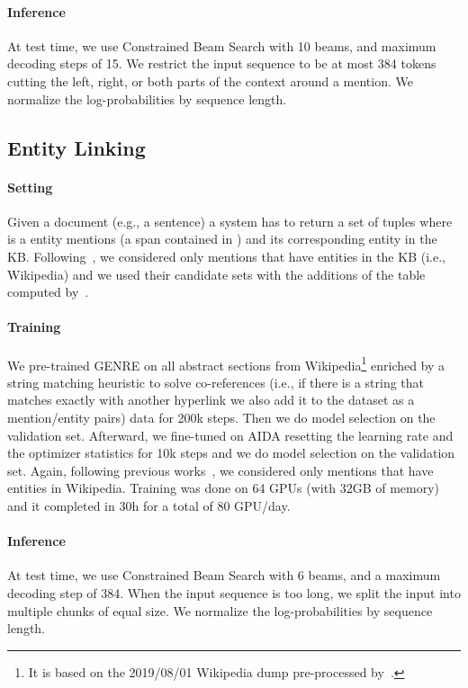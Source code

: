 \documentclass{article} \usepackage{main,times}
\makeatletter
\def\genre{\textsc{GENRE}\@\xspace}
\makeatother
\begin{document}
\paragraph{Inference}
At test time, we use Constrained Beam Search with 10 beams, and maximum decoding steps of 15. We restrict the input sequence to be at most 384 tokens cutting the left, right, or both parts of the context around a mention.  We normalize the log-probabilities by sequence length.


\subsection{Entity Linking} \label{app:hyper_el}

\paragraph{Setting}
Given a document  (e.g., a sentence) a system has to return a set of tuples  where  is a entity mentions (a span contained in ) and  its corresponding entity in the KB. Following~\citet{kolitsas-etal-2018-end}, we considered only mentions that have entities in the KB (i.e., Wikipedia) and we used their candidate sets with the additions of the table computed by~\citet{hoffart-etal-2011-robust}. 

\paragraph{Training}
We pre-trained \genre on all abstract sections from Wikipedia\footnote{It is based on the 2019/08/01 Wikipedia dump pre-processed by~\citet{petroni2020kilt}.} enriched by a string matching heuristic to solve co-references (i.e., if there is a string that matches exactly with another hyperlink we also add it to the dataset as a mention/entity pairs) data for 200k steps. Then we do model selection on the validation set. Afterward, we fine-tuned on AIDA resetting the learning rate and the optimizer statistics for 10k steps and we do model selection on the validation set. Again, following previous works~\citep{kolitsas-etal-2018-end}, we considered only mentions that have entities in Wikipedia. Training was done on 64 GPUs (with 32GB of memory) and it completed in 30h for a total of 80 GPU/day.

\paragraph{Inference}
At test time, we use Constrained Beam Search with 6 beams, and a maximum decoding step of 384. When the input sequence is too long, we split the input into multiple chunks of equal size. We normalize the log-probabilities by sequence length.
\end{document}
